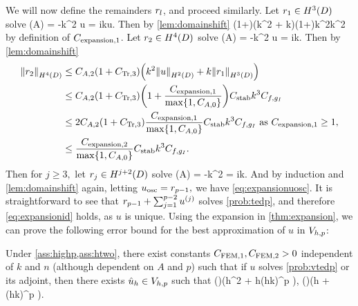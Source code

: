 We will now define the remainders $r_{l}$, and proceed similarly.
Let $\ro \in \HthD$ solve
\beqs
\grad \cdot \mleft(A\grad \ro\mright) = -k^2 u \tand \dn \ro = ik\trGI u.
\eeqs
Then by \cref{lem:domainshift}
\beqs%
\NHthD{\ro} \leq \CAo\mleft(1+\CTrt\mright)\mleft(k^2 + k\mright)\leq \CAo\mleft(1+\CTrt\mright)k^2\CAnk\Cfg\leq {}k^2\CAnk \Cfg
\eeqs%
by definition of $C_{\mathrm{expansion},1}$.
Let $\rt \in \HfD$ solve
\beqs
\grad \cdot \mleft(A\grad \rt\mright) = -k^2 u \tand \dn \rt = ik\trGI \ro.
\eeqs
Then by \cref{lem:domainshift}
\begin{align*}
\NHfD{\rt} &\leq \CAt\mleft(1+\CTrth\mright)\mleft(k^2\NHtD{u} + k\NHthD{\ro}\mright)\\
&\leq \CAt\mleft(1+\CTrth\mright)\mleft(1 + \frac{\Cefn{1}}{\max\set{1,\CAz}}\mright)\CAnk k^3\Cfg\\
&\leq 2\CAt\mleft(1+\CTrth\mright)\frac{\Cefn{1}}{\max\set{1,\CAz}}\CAnk k^3 \Cfg\text{ as } \Cefn{1} \geq 1,\\
&\leq \frac{\Cefn{2}}{\max\set{1,\CAz}}\CAnk k^3\Cfg.
\end{align*}
Then for $j \geq 3,$ let $\rj \in \HjptD$ solve
\beqs
\grad \cdot \mleft(A\grad \rt\mright) = -k^2 \rjmt \tand \dn \rj = ik\trGI\rjmo.
\eeqs
And by induction and \cref{lem:domainshift} again, letting $u_{\mathrm{osc}} = r_{p-1},$ we have \cref{eq:expansionuosc}. It is straightforward to see that $r_{p-1} + \sum_{j=1}^{p-2} u^{(j)}$ solves \cref{prob:tedp}, and therefore \cref{eq:expansionid} holds, as $u$ is unique.
\epf
Using the expansion in \cref{thm:expansion}, we can prove the following error bound for the best approximation of $u$ in $V_{h,p}$:


\label{lem:bestapprox}
Under \cref{ass:highp,ass:htwo}, there exist constants $C_{\mathrm{FEM},1}, C_{\mathrm{FEM},2} > 0$ independent of $k$ and $n$ (although dependent on $A$ and $p$) such that if $u$ solves \cref{prob:vtedp} or its adjoint, then there exists $\hat{u}_{h} \in V_{h,p}$ such that
\beq\label{eq:bestapproxL2}
 \leq {}\mleft(\nmax\mright)\mleft(\CFEMo  h^2 + \CFEMt \CAnk h\mleft(hk\mright)^p \mright)\Cfg,
\eeq
\beq\label{eq:bestapproxW}
 \mleft(\nmax\mright)\mleft(\CFEMo  h + \CFEMt \CAnk \mleft(hk\mright)^p \mright)\Cfg.
\eeq
\ele

